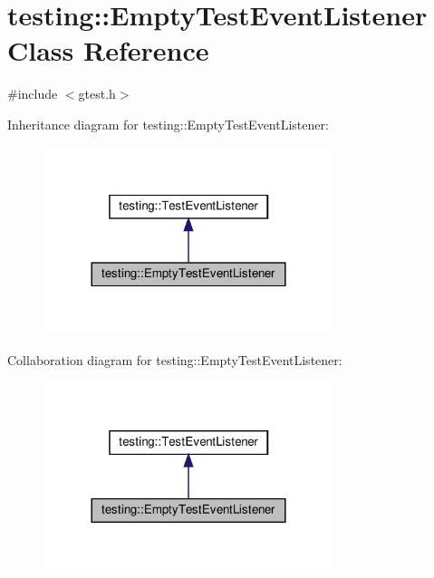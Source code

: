 \hypertarget{classtesting_1_1EmptyTestEventListener}{}\section{testing\+:\+:Empty\+Test\+Event\+Listener Class Reference}
\label{classtesting_1_1EmptyTestEventListener}


{\ttfamily \#include $<$gtest.\+h$>$}



Inheritance diagram for testing\+:\+:Empty\+Test\+Event\+Listener\+:\nopagebreak
\begin{figure}[H]
\begin{center}
\leavevmode
\includegraphics[width=240pt]{classtesting_1_1EmptyTestEventListener__inherit__graph}
\end{center}
\end{figure}


Collaboration diagram for testing\+:\+:Empty\+Test\+Event\+Listener\+:\nopagebreak
\begin{figure}[H]
\begin{center}
\leavevmode
\includegraphics[width=240pt]{classtesting_1_1EmptyTestEventListener__coll__graph}
\end{center}
\end{figure}
